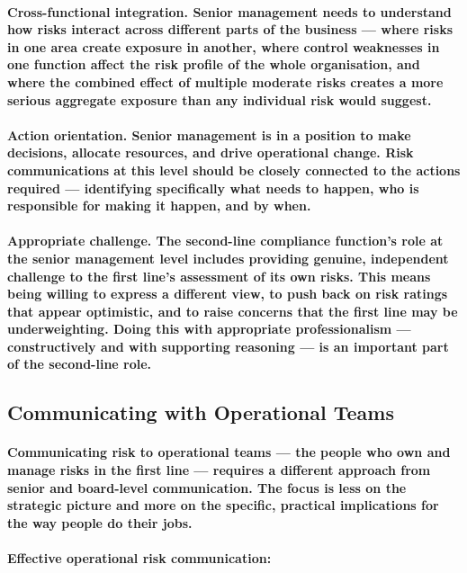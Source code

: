 \paragraph{\textbf{Cross-functional integration}. Senior management needs to understand how risks interact across different parts of the business — where risks in one area create exposure in another, where control weaknesses in one function affect the risk profile of the whole organisation, and where the combined effect of multiple moderate risks creates a more serious aggregate exposure than any individual risk would suggest.}
\paragraph{\textbf{Action orientation}. Senior management is in a position to make decisions, allocate resources, and drive operational change. Risk communications at this level should be closely connected to the actions required — identifying specifically what needs to happen, who is responsible for making it happen, and by when.}
\paragraph{\textbf{Appropriate challenge}. The second-line compliance function's role at the senior management level includes providing genuine, independent challenge to the first line's assessment of its own risks. This means being willing to express a different view, to push back on risk ratings that appear optimistic, and to raise concerns that the first line may be underweighting. Doing this with appropriate professionalism — constructively and with supporting reasoning — is an important part of the second-line role.}

\subsection{Communicating with Operational Teams}
\paragraph{Communicating risk to operational teams — the people who own and manage risks in the first line — requires a different approach from senior and board-level communication. The focus is less on the strategic picture and more on the specific, practical implications for the way people do their jobs.}
\paragraph{Effective operational risk communication:}
